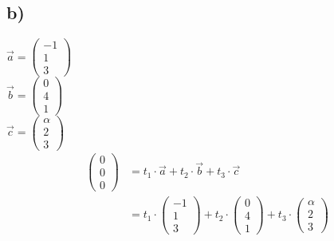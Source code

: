\documentclass[]{article}
\begin{document}
\subsection*{b)}
$\vec{a}  = \begin{pmatrix}
	-1\\1\\3
\end{pmatrix}$\\
$\vec{b}  = \begin{pmatrix}
	0\\4\\1
\end{pmatrix}$\\
$\vec{c}  = \begin{pmatrix}
	\alpha\\2\\3
\end{pmatrix}$\\
\newpage
\begin{align*}
	&& \begin{pmatrix}0\\0\\0\end{pmatrix} &= t_1 \cdot \vec{a} + t_2 \cdot \vec{b}+ t_3 \cdot \vec{c} &&\\
	&&  &= t_1\cdot \begin{pmatrix}-1\\1\\3
	\end{pmatrix} + t_2 \cdot \begin{pmatrix}0\\4\\1\end{pmatrix}+ t_3 \cdot \begin{pmatrix}\alpha\\2\\3\end{pmatrix} &&\\
\end{align*}
\end{document}
